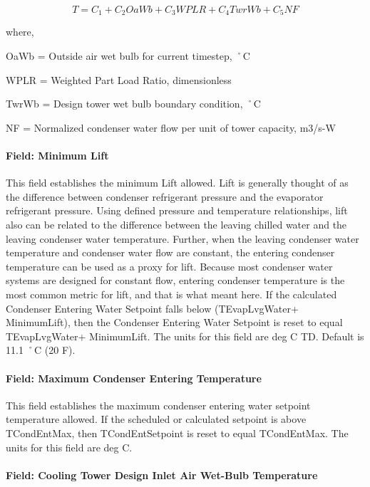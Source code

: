 \begin{equation}
T = {C_1} + {C_2}OaWb + {C_3}WPLR + {C_4}TwrWb + {C_5}NF
\end{equation}

where,

OaWb = Outside air wet bulb for current timestep, ˚C

WPLR = Weighted Part Load Ratio, dimensionless

TwrWb = Design tower wet bulb boundary condition, ˚C

NF = Normalized condenser water flow per unit of tower capacity, m3/s-W

\paragraph{Field: Minimum Lift}\label{field-minimum-lift}

This field establishes the minimum Lift allowed. Lift is generally thought of as the difference between condenser refrigerant pressure and the evaporator refrigerant pressure. Using defined pressure and temperature relationships, lift also can be related to the difference between the leaving chilled water and the leaving condenser water temperature. Further, when the leaving condenser water temperature and condenser water flow are constant, the entering condenser temperature can be used as a proxy for lift. Because most condenser water systems are designed for constant flow, entering condenser temperature is the most common metric for lift, and that is what meant here. If the calculated Condenser Entering Water Setpoint falls below (TEvapLvgWater+ MinimumLift), then the Condenser Entering Water Setpoint is reset to equal TEvapLvgWater+ MinimumLift. The units for this field are deg C TD. Default is 11.1 ˚C (20 F).

\paragraph{Field: Maximum Condenser Entering Temperature}\label{field-maximum-condenser-entering-temperature}

This field establishes the maximum condenser entering water setpoint temperature allowed. If the scheduled or calculated setpoint is above TCondEntMax, then TCondEntSetpoint is reset to equal TCondEntMax. The units for this field are deg C.

\paragraph{Field: Cooling Tower Design Inlet Air Wet-Bulb Temperature}\label{field-cooling-tower-design-inlet-air-wet-bulb-temperature}

